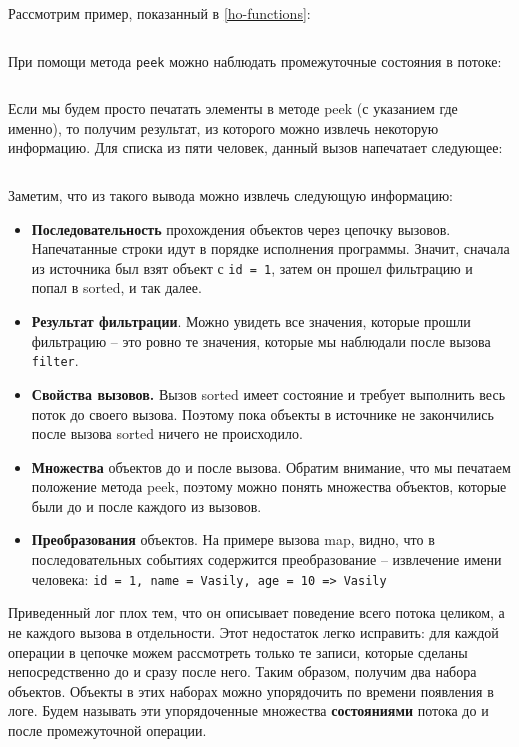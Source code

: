 Рассмотрим пример, показанный в \ref{ho-functions}:

\inputminted{java}{chapter2/code/StreaMWithoutPeeks.java}
При помощи метода \texttt{peek} можно наблюдать промежуточные состояния в потоке:
\inputminted{java}{chapter2/code/StreamWithPeeks.java}

Если мы будем просто печатать элементы в методе peek (с указанием где именно), то получим результат, из которого можно извлечь некоторую информацию. Для списка из пяти человек, данный вызов напечатает следующее:
\inputminted{java}{chapter2/code/peekResults.txt}

Заметим, что из такого вывода можно извлечь следующую информацию:
\begin{itemize}
	\item \textbf{Последовательность} прохождения объектов через цепочку вызовов. Напечатанные строки идут в порядке исполнения программы. Значит, сначала из источника был взят объект с \texttt{id = 1}, затем он прошел фильтрацию и попал в sorted, и так далее.
	\item \textbf{Результат фильтрации}. Можно увидеть все значения, которые прошли фильтрацию -- это ровно те значения, которые мы наблюдали после вызова \texttt{filter}.
	\item \textbf{Свойства вызовов.} Вызов sorted имеет состояние и требует выполнить весь поток до своего вызова. Поэтому пока объекты в источнике не закончились после вызова sorted ничего не происходило.
	\item \textbf{Множества } объектов до и после вызова. Обратим внимание, что мы печатаем положение метода peek, поэтому можно понять множества объектов, которые были до и после каждого из вызовов.
	\item \textbf{Преобразования} объектов. На примере вызова map, видно, что в последовательных событиях содержится преобразование -- извлечение имени человека: \texttt{{id = 1, name = Vasily, age = 10} => Vasily}
\end{itemize}

Приведенный лог плох тем, что он описывает поведение всего потока целиком, а не каждого вызова в отдельности. Этот недостаток легко исправить: для каждой операции в цепочке можем рассмотреть только те записи, которые сделаны непосредственно до и сразу после него. Таким образом, получим два набора объектов. Объекты в этих наборах можно упорядочить по времени появления в логе. Будем называть эти упорядоченные множества \textbf{состояниями} потока до и после промежуточной операции. 

